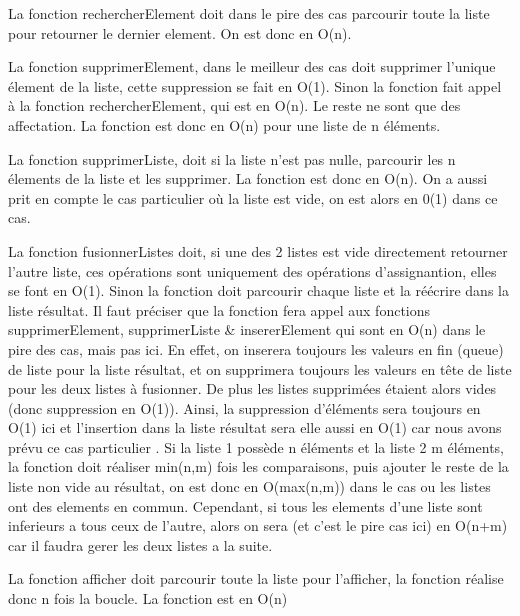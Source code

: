 \documentclass[11pt]{report}
\begin{document}
\medskip

La fonction rechercherElement doit dans le pire des cas parcourir toute la liste pour retourner le dernier element. On est donc en O(n).

\medskip

La fonction supprimerElement, dans le meilleur des cas doit supprimer l'unique élement de la liste, cette suppression se fait en O(1). Sinon la fonction fait appel à la fonction rechercherElement, qui est en O(n). Le reste ne sont que des affectation. La fonction est donc en O(n) pour une liste de n éléments.

\medskip

La fonction supprimerListe, doit si la liste n'est pas nulle, parcourir les n élements de la liste et les supprimer. La fonction est donc en O(n). On a aussi prit en compte le cas particulier où la liste est vide, on est alors en 0(1) dans ce cas.   

\medskip

La fonction fusionnerListes doit, si une des 2 listes est vide directement retourner l'autre liste, ces opérations sont uniquement des opérations d'assignantion, elles se font en O(1). Sinon la fonction doit parcourir chaque liste et la réécrire dans la liste résultat. Il faut préciser que la fonction fera appel aux fonctions supprimerElement, supprimerListe & insererElement qui sont en O(n) dans le pire des cas, mais pas ici. En effet, on inserera toujours les valeurs en fin (queue) de liste pour la liste résultat, et on supprimera toujours les valeurs en tête de liste pour les deux listes à fusionner. De plus les listes supprimées étaient alors vides (donc suppression en O(1)). Ainsi, la suppression d'éléments sera toujours en O(1) ici et l'insertion dans la liste résultat sera elle aussi en O(1) car nous avons prévu ce cas particulier . Si la liste 1 possède n éléments et la liste 2 m éléments, la fonction doit réaliser min(n,m) fois les comparaisons, puis ajouter le reste de la liste non vide au résultat, on est donc en O(max(n,m)) dans le cas ou les listes ont des elements en commun. Cependant, si tous les elements d'une liste sont inferieurs a tous ceux de l'autre, alors on sera (et c'est le pire cas ici) en O(n+m) car il faudra gerer les deux listes a la suite.

\medskip

La fonction afficher doit parcourir toute la liste pour l'afficher, la fonction réalise donc n fois la boucle. La fonction est en O(n)

\medskip
\end{document}

